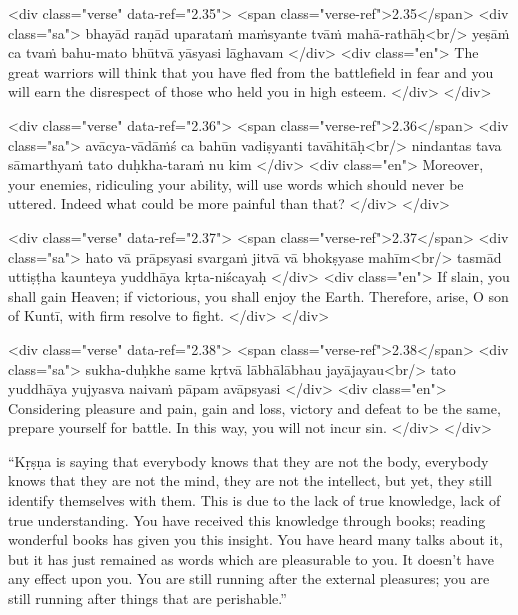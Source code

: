 \begin{html}
<div class="verse" data-ref="2.35">
  <span class="verse-ref">2.35</span>
  <div class="sa">
    bhayād raṇād uparataṁ maṁsyante tvāṁ mahā-rathāḥ<br/>
    yeṣāṁ ca tvaṁ bahu-mato bhūtvā yāsyasi lāghavam
  </div>
  <div class="en">
    The great warriors will think that you have fled from the battlefield in fear and you will earn the disrespect of those who held you in high esteem.
  </div>
</div>
\end{html}



\begin{html}
<div class="verse" data-ref="2.36">
  <span class="verse-ref">2.36</span>
  <div class="sa">
    avācya-vādāṁś ca bahūn vadiṣyanti tavāhitāḥ<br/>
    nindantas tava sāmarthyaṁ tato duḥkha-taraṁ nu kim
  </div>
  <div class="en">
    Moreover, your enemies, ridiculing your ability, will use words which should never be uttered. Indeed what could be more painful than that?
  </div>
</div>
\end{html}



\begin{html}
<div class="verse" data-ref="2.37">
  <span class="verse-ref">2.37</span>
  <div class="sa">
    hato vā prāpsyasi svargaṁ jitvā vā bhokṣyase mahīm<br/>
    tasmād uttiṣṭha kaunteya yuddhāya kṛta-niścayaḥ
  </div>
  <div class="en">
    If slain, you shall gain Heaven; if victorious, you shall enjoy the Earth. Therefore, arise, O son of Kuntī, with firm resolve to fight.
  </div>
</div>
\end{html}



\begin{html}
<div class="verse" data-ref="2.38">
  <span class="verse-ref">2.38</span>
  <div class="sa">
    sukha-duḥkhe same kṛtvā lābhālābhau jayājayau<br/>
    tato yuddhāya yujyasva naivaṁ pāpam avāpsyasi
  </div>
  <div class="en">
    Considering pleasure and pain, gain and loss, victory and defeat to be the same, prepare yourself for battle. In this way, you will not incur sin.
  </div>
</div>
\end{html}


\enquote{Kṛṣṇa is saying that everybody knows that they are not the body, everybody knows that they are not the mind, they are not the intellect, but yet, they still identify themselves with them. This is due to the lack of true knowledge, lack of true understanding. You have received this knowledge through books; reading wonderful books has given you this insight. You have heard many talks about it, but it has just remained as words which are pleasurable to you. It doesn’t have any effect upon you. You are still running after the external pleasures; you are still running after things that are perishable.}

